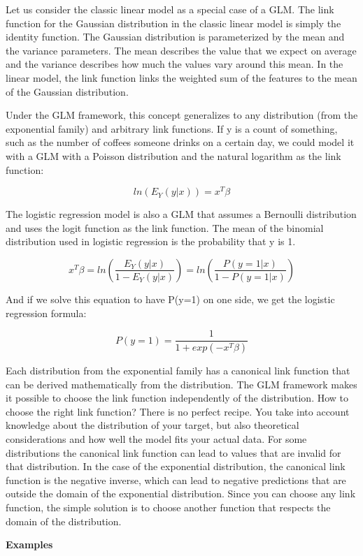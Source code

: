 \documentclass[
  11pt,
]{scrbook}
\begin{document}
Let us consider the classic linear model as a special case of a GLM.
The link function for the Gaussian distribution in the classic linear model is simply the identity function.
The Gaussian distribution is parameterized by the mean and the variance parameters.
The mean describes the value that we expect on average and the variance describes how much the values vary around this mean.
In the linear model, the link function links the weighted sum of the features to the mean of the Gaussian distribution.

Under the GLM framework, this concept generalizes to any distribution (from the exponential family) and arbitrary link functions.
If y is a count of something, such as the number of coffees someone drinks on a certain day, we could model it with a GLM with a Poisson distribution and the natural logarithm as the link function:

\[ln(E_Y(y|x))=x^{T}\beta\]

The logistic regression model is also a GLM that assumes a Bernoulli distribution and uses the logit function as the link function.
The mean of the binomial distribution used in logistic regression is the probability that y is 1.

\[x^{T}\beta=ln\left(\frac{E_Y(y|x)}{1-E_Y(y|x)}\right)=ln\left(\frac{P(y=1|x)}{1-P(y=1|x)}\right)\]

And if we solve this equation to have P(y=1) on one side, we get the logistic regression formula:

\[P(y=1)=\frac{1}{1+exp(-x^{T}\beta)}\]

Each distribution from the exponential family has a canonical link function that can be derived mathematically from the distribution.
The GLM framework makes it possible to choose the link function independently of the distribution.
How to choose the right link function?
There is no perfect recipe.
You take into account knowledge about the distribution of your target, but also theoretical considerations and how well the model fits your actual data.
For some distributions the canonical link function can lead to values that are invalid for that distribution.
In the case of the exponential distribution, the canonical link function is the negative inverse, which can lead to negative predictions that are outside the domain of the exponential distribution.
Since you can choose any link function, the simple solution is to choose another function that respects the domain of the distribution.

\textbf{Examples}
\end{document}
